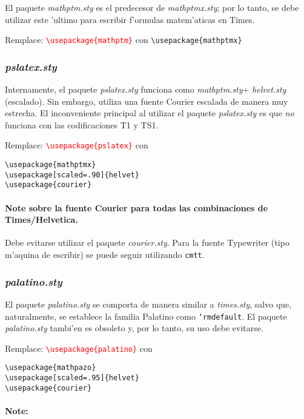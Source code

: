 \documentclass[11pt,a4paper,pagesize,tablecaptionabove,abstracton,pointlessnumbers]{scrartcl}
\newcommand{\gl}{\guillemotleft}
\newcommand{\gr}{\guillemotright}
\newcommand{\TB}{\textbackslash}
\newcommand{\Paket}[1]{\textsf{\textsl{#1.sty}}\xspace}
\newcommand{\Use}[1]{\texttt{\textbackslash usepackage\{#1\}}}
\newcommand{\UseO}[2]{\texttt{\TB usepackage[#1]\{#2\}}}
\DeclareRobustCommand*{\Macro}[1]{\mbox{\texttt{\char`\\#1}}}
\newcommand{\Ersetze}[2]{\par\noindent Remplace: \textcolor{red}{#1}
  con \textcolor{gruen}{#2}}
\begin{document}
El paquete \Paket{mathptm} es el predecesor de \Paket{mathptmx}; por lo tanto, se debe utilizar este 'ultimo para escribir f'ormulas matem'aticas en Times.

\Ersetze{\Use{mathptm}}{\Use{mathptmx}}

\subsubsection{\Paket{pslatex}}
\label{sec:paketpslatex}

Internamente, el paquete \Paket{pslatex} funciona como \Paket{mathptm}$+$
\Paket{helvet} (escalado). Sin embargo, utiliza una fuente Courier escalada de manera muy estrecha. El inconveniente principal al utilizar el paquete \Paket{pslatex} es que \emph{no} funciona con las codificaciones T1 y TS1.

\Ersetze{\Use{pslatex}}{\parbox[t]{\wd\Breite}{\Use{mathptmx}\\\UseO{scaled=.90}{helvet}\\\Use{courier}}}

\paragraph{Note sobre la fuente Courier para todas las combinaciones de Times/Helvetica.}
\label{sec:anmerkung-zu-allen}

Debe evitarse utilizar el paquete \Paket{courier}. Para la fuente Typewriter (tipo \gl m'aquina de escribir\gr) se puede seguir utilizando \texttt{cmtt}.

\subsubsection{\Paket{palatino}}
\label{sec:paketpalatino}

El paquete \Paket{palatino} se comporta de manera similar a \Paket{times}, salvo que, naturalmente, se establece la familia Palatino como \Macro{rmdefault}. El paquete \Paket{palatino} tambi'en es obsoleto y, por lo tanto, su uso debe evitarse.

\Ersetze{\Use{palatino}}{\parbox[t]{\wd\Breite}{\Use{mathpazo}\\\UseO{scaled=.95}{helvet}\\\Use{courier}}}

\paragraph{Note:}
\label{sec:anmerkung-2}
\end{document}
